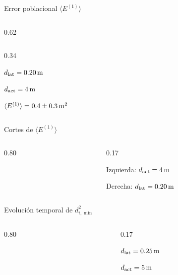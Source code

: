 \begin{frame}{Error poblacional $\langle E^{(1)}\rangle$}
  \begin{cols}
    \begin{column}{0.62\textwidth}
    \end{column}
    \begin{column}{0.34\textwidth}
      \begin{resultado}[Óptimo]
        \item $d_{\mathrm{lat}} = 0.20\,\mathrm{m}$
        \item $d_{\mathrm{act}} = 4\,\mathrm{m}$
        \item $\langle E^{(1)}\rangle = 0.4 \pm 0.3\,\mathrm{m^2}$
      \end{resultado}
    \end{column}
  \end{cols}
\end{frame}

\begin{frame}{Cortes de $\langle E^{(1)}\rangle$}
  \begin{columns}[c]
    \begin{column}{0.80\textwidth}
    \end{column}
    \begin{column}{0.17\textwidth}
      \begin{parametros}
        \item Izquierda: $d_{\mathrm{act}} = 4\,\mathrm{m}$
        \item Derecha: $d_{\mathrm{lat}} = 0.20\,\mathrm{m}$
      \end{parametros}
    \end{column}
  \end{columns}
\end{frame}

\begin{frame}{Evolución temporal de $d^2_{i,\min}$}
  \begin{columns}[c]
    \begin{column}{0.80\textwidth}
    \end{column}
    \begin{column}{0.17\textwidth}
      \begin{parametros}
        \item $d_{\mathrm{lat}} = 0.25\,\mathrm{m}$
        \item $d_{\mathrm{act}} = 5\,\mathrm{m}$
      \end{parametros}
    \end{column}
  \end{columns}
\end{frame}

